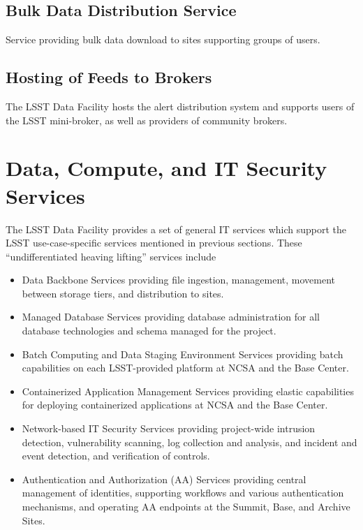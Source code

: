 \subsection{Bulk Data Distribution Service}
Service providing bulk data download to sites supporting groups of users.


\subsection{Hosting of Feeds to Brokers}
The LSST Data Facility hosts the alert distribution system and supports users of
the LSST mini-broker, as well as providers of community brokers.



\section{Data, Compute, and IT Security Services}
The LSST Data Facility provides a set of general IT services which support the
LSST use-case-specific services mentioned in previous sections. These
``undifferentiated heaving lifting'' services include

\begin{itemize}
\item Data Backbone Services providing file ingestion, management, movement
between storage tiers, and distribution to sites.
\item Managed Database Services providing database administration for all
database technologies and schema managed for the project.
\item Batch Computing and Data Staging Environment Services providing batch
capabilities on each LSST-provided platform at NCSA and the Base Center.
\item Containerized Application Management Services providing elastic
capabilities for deploying containerized applications at NCSA and the Base Center.
\item Network-based IT Security Services providing project-wide intrusion
detection, vulnerability scanning, log collection and analysis, and incident and
event detection, and verification of controls.
\item Authentication and Authorization (AA) Services providing central management of
identities, supporting workflows and various authentication mechanisms, and
operating AA endpoints at the Summit, Base, and Archive Sites.
\end{itemize}


